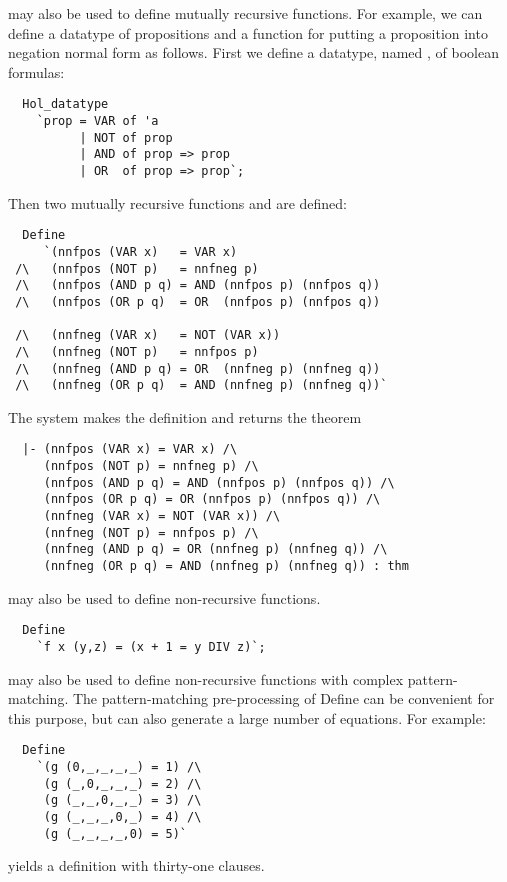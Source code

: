  may also be used to define mutually recursive functions. 
For example, we can define a datatype of propositions and a function for
putting a proposition into negation normal form as follows.  
First we define a datatype, named , of boolean formulas:
%
\begin{hol}
\begin{verbatim}
  Hol_datatype
    `prop = VAR of 'a
          | NOT of prop
          | AND of prop => prop
          | OR  of prop => prop`;
\end{verbatim}
\end{hol}
%
Then two mutually recursive functions  and 
are defined:
%
\begin{hol}
\begin{verbatim}
  Define
     `(nnfpos (VAR x)   = VAR x)
 /\   (nnfpos (NOT p)   = nnfneg p)
 /\   (nnfpos (AND p q) = AND (nnfpos p) (nnfpos q))
 /\   (nnfpos (OR p q)  = OR  (nnfpos p) (nnfpos q))

 /\   (nnfneg (VAR x)   = NOT (VAR x))
 /\   (nnfneg (NOT p)   = nnfpos p)
 /\   (nnfneg (AND p q) = OR  (nnfneg p) (nnfneg q))
 /\   (nnfneg (OR p q)  = AND (nnfneg p) (nnfneg q))`
\end{verbatim}
\end{hol}
%
The system makes the definition and returns the theorem
%
\begin{hol}
\begin{verbatim}
  |- (nnfpos (VAR x) = VAR x) /\
     (nnfpos (NOT p) = nnfneg p) /\
     (nnfpos (AND p q) = AND (nnfpos p) (nnfpos q)) /\
     (nnfpos (OR p q) = OR (nnfpos p) (nnfpos q)) /\
     (nnfneg (VAR x) = NOT (VAR x)) /\
     (nnfneg (NOT p) = nnfpos p) /\
     (nnfneg (AND p q) = OR (nnfneg p) (nnfneg q)) /\
     (nnfneg (OR p q) = AND (nnfneg p) (nnfneg q)) : thm
\end{verbatim}
\end{hol}
 
\ml{Define} may also be used to define non-recursive functions.
%
\begin{hol}
\begin{verbatim}
  Define 
    `f x (y,z) = (x + 1 = y DIV z)`;
\end{verbatim}
\end{hol}

\ml{Define} may also be used to define non-recursive functions
with complex pattern-matching. The pattern-matching pre-processing of
{Define} can be convenient for this purpose, but can also generate a
large number of equations. For example:
%
\begin{hol}
\begin{verbatim}
  Define 
    `(g (0,_,_,_,_) = 1) /\
     (g (_,0,_,_,_) = 2) /\
     (g (_,_,0,_,_) = 3) /\
     (g (_,_,_,0,_) = 4) /\
     (g (_,_,_,_,0) = 5)`
\end{verbatim}
\end{hol}
%
yields a definition with thirty-one clauses.


